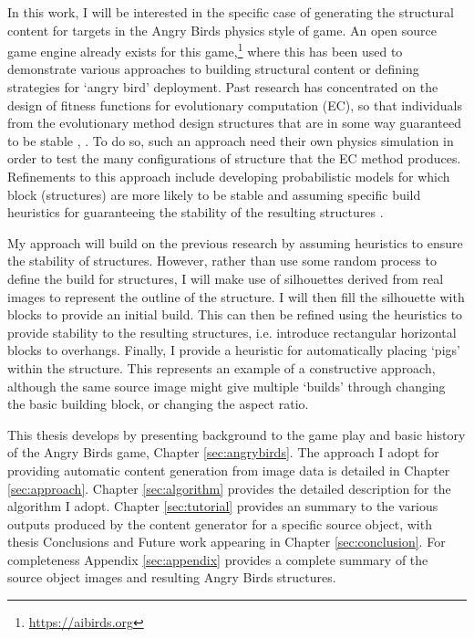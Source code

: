 \documentclass{dalthesis}
\begin{document}
In this work, I will be interested in the specific case of generating the structural content for targets in the Angry Birds physics style of game. An open source game engine already exists for this game,\footnote{\url{https://aibirds.org}} where this has been used to demonstrate various approaches to building structural content or defining strategies for `angry bird' deployment. Past research has concentrated on the design of fitness functions for evolutionary computation (EC), so that individuals from the evolutionary method design structures that are in some way guaranteed to be stable \cite{ferreira14}, \cite{ferreira18}. To do so, such an approach need their own physics simulation in order to test the many configurations of structure that the EC method produces. Refinements to this approach include developing probabilistic models for which block (structures) are more likely to be stable \cite{stephenson16} and assuming specific build heuristics for guaranteeing the stability of the resulting structures \cite{stephenson17}.

My approach will build on the previous research by assuming heuristics to ensure the stability of structures. However, rather than use some random process to define the build for structures, I will make use of silhouettes derived from real images to represent the outline of the structure. I will then fill the silhouette with blocks to provide an initial build. This can then be refined using the heuristics to provide stability to the resulting structures, i.e. introduce rectangular horizontal blocks to overhangs. Finally, I provide a heuristic for automatically placing `pigs' within the structure. This represents an example of a constructive approach, although the same source image might give multiple `builds' through changing the basic building block, or changing the aspect ratio.

This thesis develops by presenting background to the game play and basic history of the Angry Birds game, Chapter \ref{sec:angrybirds}. The approach I adopt for providing automatic content generation from image data is detailed in Chapter \ref{sec:approach}. Chapter \ref{sec:algorithm} provides the detailed description for the algorithm I adopt. Chapter \ref{sec:tutorial} provides an summary to the various outputs produced by the content generator for a specific source object, with thesis Conclusions and Future work appearing in Chapter \ref{sec:conclusion}. For completeness Appendix \ref{sec:appendix} provides a complete summary of the source object images and resulting Angry Birds structures.
\end{document}
